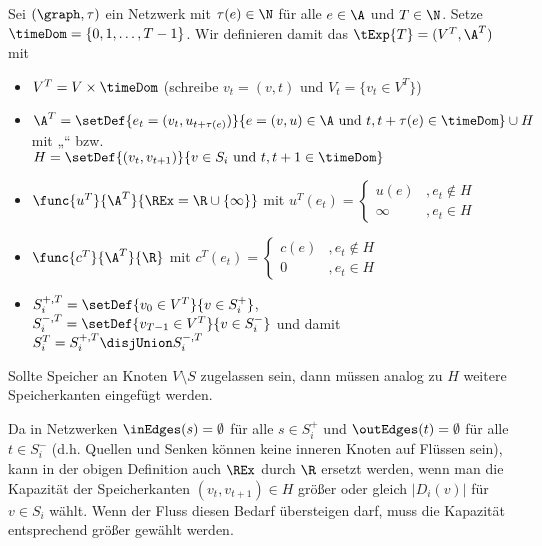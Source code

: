\begin{definition}
    Sei $(\graph, \tau)$ ein Netzwerk mit $\tau(e) \in \N$ für alle $e \in \A$
    und $T \in \N$. Setze $\timeDom = \{0, 1, \ldots, T-1\}$.
    Wir definieren damit das  $\tExp{T} = (V^T, \A^T)$
    mit
    \begin{itemize}
        \item $V^T = V \times \timeDom$ (schreibe $v_t = (v, t)$ und
            $V_t = \{v_t \in V^T\}$)
        \item $\A^T = \setDef{e_t = (v_t, u_{t + \tau(e)})}
                        {e = (v, u) \in \A \text{ und } t, t + \tau(e) \in \timeDom}
                    \cup H$ \\
            mit „“ bzw.  \\
            $H = \setDef{(v_t, v_{t+1})}
                        {v \in S_i \text{ und } t, t + 1 \in \timeDom}$
        \item $\func{u^T}{\A^T}{\REx = \R \cup \{\infty\}}$ mit
                $u^T(e_t) = \begin{cases}
                    u(e)    &, e_t \not\in H \\
                    \infty  &, e_t \in H
                \end{cases}$
        \item $\func{c^T}{\A^T}{\R}$ mit
                $c^T(e_t) = \begin{cases}
                    c(e)    &, e_t \not\in H \\
                    0       &, e_t \in H
                \end{cases}$
        \item $S_i^{+,T} = \setDef{v_0 \in V^T}{v \in S_i^+}$, \\
                $S_i^{-,T} = \setDef{v_{T-1} \in V^T}{v \in S_i^-}$ und damit \\
                $S_i^T = S_i^{+,T} \disjUnion S_i^{-,T}$
    \end{itemize}
    Sollte Speicher an Knoten $V \setminus S$ zugelassen sein, dann müssen analog
    zu $H$ weitere Speicherkanten eingefügt werden.
\end{definition}

\begin{remark}
    Da in Netzwerken $\inEdges(s) = \emptyset$ für alle $s \in S_i^+$ und
    $\outEdges(t) = \emptyset$ für alle $t \in S_i^-$ (d.h. Quellen und Senken
    können keine inneren Knoten auf Flüssen sein), kann in der obigen Definition
    auch $\REx$ durch $\R$ ersetzt werden, wenn man die Kapazität der
    Speicherkanten $(v_t, v_{t+1}) \in H$ größer oder gleich $|D_i(v)|$ für
    $v \in S_i$ wählt. Wenn der Fluss diesen Bedarf übersteigen darf,
    muss die Kapazität entsprechend größer gewählt werden.
\end{remark}


